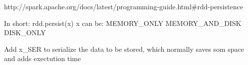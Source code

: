 http://spark.apache.org/docs/latest/programming-guide.html#rdd-persistence

In short:
rdd.persist(x)
x can be:
MEMORY_ONLY
MEMORY_AND_DISK
DISK_ONLY

Add x_SER to serialize the data to be stored, which normally saves som space and adds exectution time